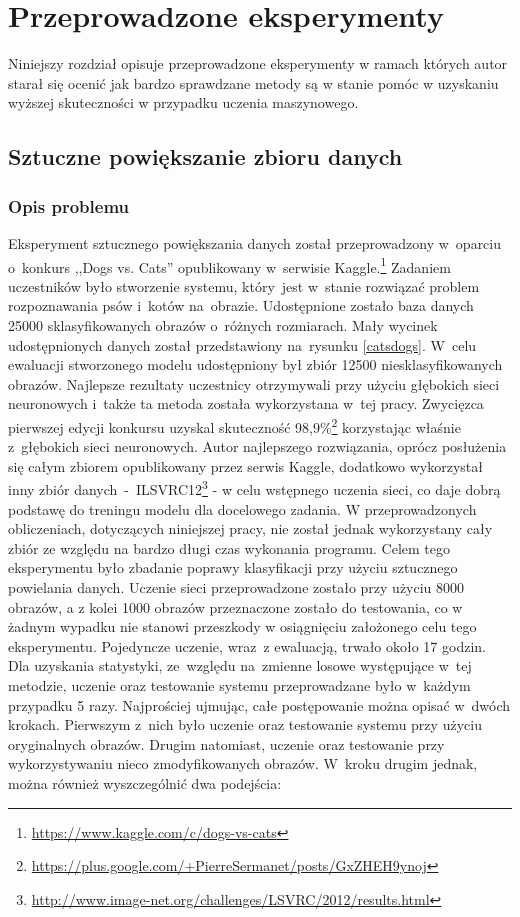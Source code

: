 \section{Przeprowadzone eksperymenty} \label{results}
Niniejszy rozdział opisuje przeprowadzone eksperymenty w ramach których autor starał się ocenić jak bardzo sprawdzane metody są w stanie pomóc w uzyskaniu wyższej skuteczności w przypadku uczenia maszynowego. 

\subsection{Sztuczne powiększanie zbioru danych}
\subsubsection{Opis problemu}
Eksperyment sztucznego powiększania danych został przeprowadzony w~oparciu o~konkurs ,,Dogs vs. Cats'' opublikowany w~serwisie Kaggle.\footnote{\label{myfootnote1}\url{https://www.kaggle.com/c/dogs-vs-cats}} Zadaniem uczestników było stworzenie systemu, który~jest w~stanie rozwiązać problem rozpoznawania psów i~kotów na~obrazie. Udostępnione zostało baza danych 25000 sklasyfikowanych obrazów o~różnych rozmiarach. Mały wycinek udostępnionych danych został przedstawiony na~rysunku \ref{catsdogs}. W~celu ewaluacji stworzonego modelu udostępniony był zbiór 12500 niesklasyfikowanych obrazów. Najlepsze rezultaty uczestnicy otrzymywali przy użyciu głębokich sieci neuronowych i~także ta metoda została wykorzystana w~tej pracy. Zwycięzca pierwszej edycji konkursu uzyskal skuteczność 98,9\%\footnote{\label{myfootnote2}\url{https://plus.google.com/+PierreSermanet/posts/GxZHEH9ynoj}} korzystając właśnie z~głębokich sieci neuronowych. Autor najlepszego rozwiązania, oprócz posłużenia się całym zbiorem opublikowany przez serwis Kaggle, dodatkowo wykorzystał inny zbiór danych~-~ILSVRC12\footnote{\url{http://www.image-net.org/challenges/LSVRC/2012/results.html}} - w celu wstępnego uczenia sieci, co daje dobrą podstawę do treningu modelu dla docelowego zadania. W przeprowadzonych obliczeniach, dotyczących niniejszej pracy, nie został jednak wykorzystany cały zbiór ze względu na bardzo długi czas wykonania programu. Celem tego eksperymentu było zbadanie poprawy klasyfikacji przy użyciu sztucznego powielania danych. Uczenie sieci przeprowadzone zostało przy użyciu 8000 obrazów, a z kolei 1000 obrazów przeznaczone zostało do testowania, co w żadnym wypadku nie stanowi przeszkody w osiągnięciu założonego celu tego eksperymentu. Pojedyncze uczenie, wraz~z ewaluacją, trwało około 17 godzin. Dla uzyskania statystyki, ze~względu na~zmienne losowe występujące w~tej metodzie, uczenie oraz testowanie systemu przeprowadzane było w~każdym przypadku 5 razy. Najprościej ujmując, całe postępowanie można opisać w~dwóch krokach. Pierwszym z~nich było uczenie oraz testowanie systemu przy użyciu oryginalnych obrazów. Drugim natomiast, uczenie oraz testowanie przy wykorzystywaniu nieco zmodyfikowanych obrazów. W~kroku drugim jednak, można również wyszczególnić dwa podejścia:
